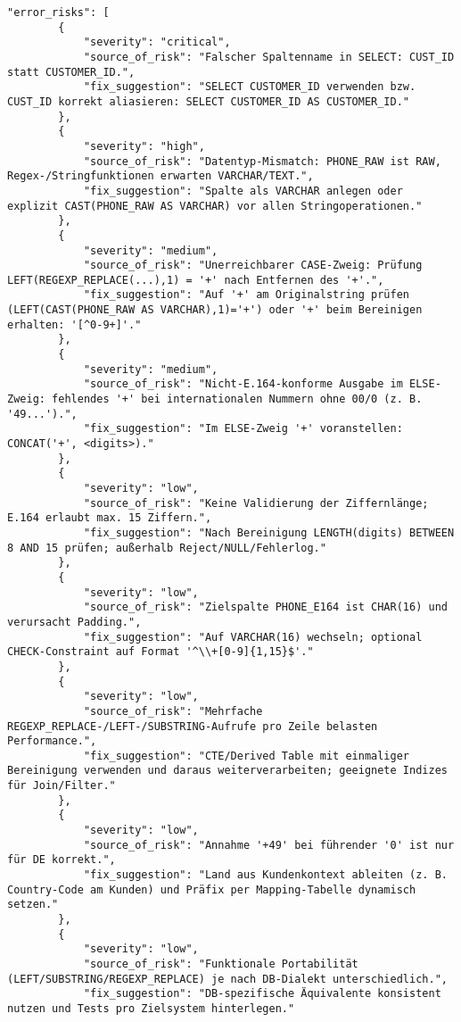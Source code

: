 \begin{lstlisting}[caption={Ausgabe: GPT-5 Anwendungsfall 3 Hauptdurchlauf},label={gpt_case3_prompt1}]
    "error_risks": [
        {
            "severity": "critical",
            "source_of_risk": "Falscher Spaltenname in SELECT: CUST_ID statt CUSTOMER_ID.",
            "fix_suggestion": "SELECT CUSTOMER_ID verwenden bzw. CUST_ID korrekt aliasieren: SELECT CUSTOMER_ID AS CUSTOMER_ID."
        },
        {
            "severity": "high",
            "source_of_risk": "Datentyp-Mismatch: PHONE_RAW ist RAW, Regex-/Stringfunktionen erwarten VARCHAR/TEXT.",
            "fix_suggestion": "Spalte als VARCHAR anlegen oder explizit CAST(PHONE_RAW AS VARCHAR) vor allen Stringoperationen."
        },
        {
            "severity": "medium",
            "source_of_risk": "Unerreichbarer CASE-Zweig: Prüfung LEFT(REGEXP_REPLACE(...),1) = '+' nach Entfernen des '+'.",
            "fix_suggestion": "Auf '+' am Originalstring prüfen (LEFT(CAST(PHONE_RAW AS VARCHAR),1)='+') oder '+' beim Bereinigen erhalten: '[^0-9+]'."
        },
        {
            "severity": "medium",
            "source_of_risk": "Nicht-E.164-konforme Ausgabe im ELSE-Zweig: fehlendes '+' bei internationalen Nummern ohne 00/0 (z. B. '49...').",
            "fix_suggestion": "Im ELSE-Zweig '+' voranstellen: CONCAT('+', <digits>)."
        },
        {
            "severity": "low",
            "source_of_risk": "Keine Validierung der Ziffernlänge; E.164 erlaubt max. 15 Ziffern.",
            "fix_suggestion": "Nach Bereinigung LENGTH(digits) BETWEEN 8 AND 15 prüfen; außerhalb Reject/NULL/Fehlerlog."
        },
        {
            "severity": "low",
            "source_of_risk": "Zielspalte PHONE_E164 ist CHAR(16) und verursacht Padding.",
            "fix_suggestion": "Auf VARCHAR(16) wechseln; optional CHECK-Constraint auf Format '^\\+[0-9]{1,15}$'."
        },
        {
            "severity": "low",
            "source_of_risk": "Mehrfache REGEXP_REPLACE-/LEFT-/SUBSTRING-Aufrufe pro Zeile belasten Performance.",
            "fix_suggestion": "CTE/Derived Table mit einmaliger Bereinigung verwenden und daraus weiterverarbeiten; geeignete Indizes für Join/Filter."
        },
        {
            "severity": "low",
            "source_of_risk": "Annahme '+49' bei führender '0' ist nur für DE korrekt.",
            "fix_suggestion": "Land aus Kundenkontext ableiten (z. B. Country-Code am Kunden) und Präfix per Mapping-Tabelle dynamisch setzen."
        },
        {
            "severity": "low",
            "source_of_risk": "Funktionale Portabilität (LEFT/SUBSTRING/REGEXP_REPLACE) je nach DB-Dialekt unterschiedlich.",
            "fix_suggestion": "DB-spezifische Äquivalente konsistent nutzen und Tests pro Zielsystem hinterlegen."

\end{lstlisting}

